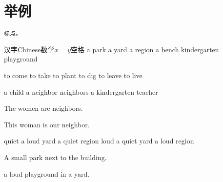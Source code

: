 \documentclass[11pt]{article}
\begin{document}
\section{举例}
\begin{verbatim}
标点。

\end{verbatim}
汉字Chinese数学$x=y$空格
a park a yard a region a bench kindergarten playground

to come to take to plant to dig to leave to live

a child a neighbor neighbors a kindergarten teacher

The women are neighbors.

This woman is our neighbor.

quiet a loud yard a quiet region loud a quiet yard a loud region

A small park next to the building.

a loud playground in a yard.
\end{document}
